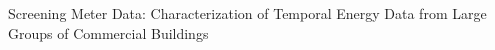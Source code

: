 Screening Meter Data: Characterization of Temporal Energy Data from Large Groups of Commercial Buildings